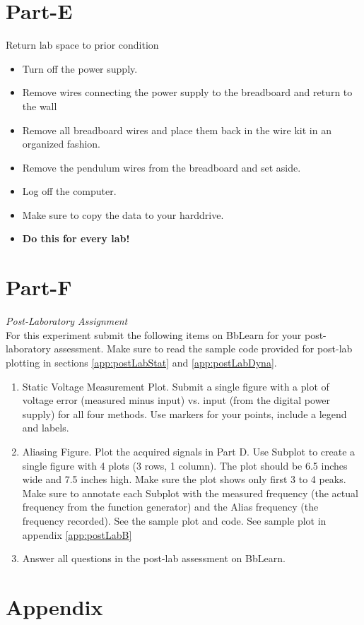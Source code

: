 \documentclass{article} %
\begin{document}
\section{Part-E}
Return lab space to prior condition
\begin{itemize}
\item Turn off the power supply.
\item Remove wires connecting the power supply to the breadboard and return to the wall
\item Remove all breadboard wires and place them back in the wire kit in an organized fashion.
\item Remove the pendulum wires from the breadboard and set aside.
\item Log off the computer.
\item Make sure to copy the data to your harddrive.
\item {\bf Do this for every lab!}
\end{itemize}

\section{Part-F}
\emph{Post-Laboratory Assignment} \\
For this experiment submit the following items on BbLearn for your post-laboratory assessment. Make sure to read the sample code provided for post-lab plotting in sections \ref{app:postLabStat} and \ref{app:postLabDyna}.
\begin{enumerate}
\item	Static Voltage Measurement Plot. Submit a single figure with a plot of voltage error (measured minus input) vs. input (from the digital power supply) for all four methods. Use markers for your points, include a legend and labels.
\item	Aliasing Figure. Plot the acquired signals in Part D. Use Subplot to create a single figure with 4 plots (3 rows, 1 column). The plot should be 6.5 inches wide and 7.5 inches high. Make sure the plot shows only first 3 to 4 peaks. Make sure to annotate each Subplot with the measured frequency (the actual frequency from the function generator) and the Alias frequency (the frequency recorded). See the sample plot and code. See sample plot in appendix \ref{app:postLabB}
\item Answer all questions in the post-lab assessment on BbLearn.
\end{enumerate}

\section{Appendix}
%
%
\end{document}
